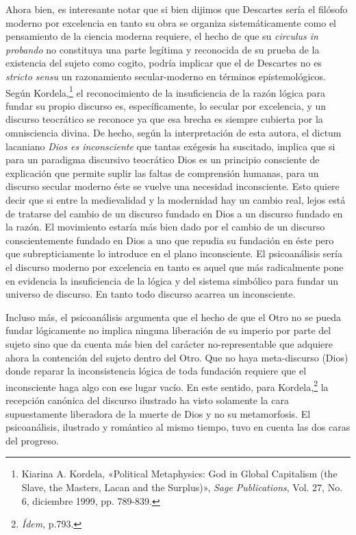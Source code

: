 Ahora bien, es interesante notar que si bien dijimos que Descartes sería el filósofo moderno por excelencia en tanto su obra se organiza sistemáticamente como el pensamiento de la ciencia moderna requiere, el hecho de que su \emph{circulus in probando} no constituya una parte legítima y reconocida de su prueba de la existencia del sujeto como cogito, podría implicar que el de Descartes no es \emph{stricto sensu} un razonamiento secular-moderno en términos epistemológicos. Según Kordela,\footnote{Kiarina A. Kordela, «Political Metaphysics: God in Global Capitalism (the Slave, the Masters, Lacan and the Surplus)», \emph{Sage Publications}, Vol. 27, No. 6, diciembre 1999, pp. 789-839.} el reconocimiento de la insuficiencia de la razón lógica para fundar su propio discurso es, específicamente, lo secular por excelencia, y un discurso teocrático se reconoce ya que esa brecha es siempre cubierta por la omnisciencia divina. De hecho, según la interpretación de esta autora, el dictum lacaniano \emph{Dios es inconsciente} que tantas exégesis ha suscitado, implica que si para un paradigma discursivo teocrático Dios es un principio consciente de explicación que permite suplir las faltas de comprensión humanas, para un discurso secular moderno éste se vuelve una necesidad inconsciente. Esto quiere decir que si entre la medievalidad y la modernidad hay un cambio real, lejos está de tratarse del cambio de un discurso fundado en Dios a un discurso fundado en la razón. El movimiento estaría más bien dado por el cambio de un discurso conscientemente fundado en Dios a uno que repudia su fundación en éste pero que subrepticiamente lo introduce en el plano inconsciente. El psicoanálisis sería el discurso moderno por excelencia en tanto es aquel que más radicalmente pone en evidencia la insuficiencia de la lógica y del sistema simbólico para fundar un universo de discurso. En tanto todo discurso acarrea un inconsciente.

Incluso más, el psicoanálisis argumenta que el hecho de que el Otro no se pueda fundar lógicamente no implica ninguna liberación de su imperio por parte del sujeto sino que da cuenta más bien del carácter no-representable que adquiere ahora la contención del sujeto dentro del Otro. Que no haya meta-discurso (Dios) donde reparar la inconsistencia lógica de toda fundación requiere que el inconsciente haga algo con ese lugar vacío. En este sentido, para Kordela,\footnote{\emph{Ídem}, p.793.} la recepción canónica del discurso ilustrado ha visto solamente la cara supuestamente liberadora de la muerte de Dios y no su metamorfosis. El psicoanálisis, ilustrado y romántico al mismo tiempo, tuvo en cuenta las dos caras del progreso.


